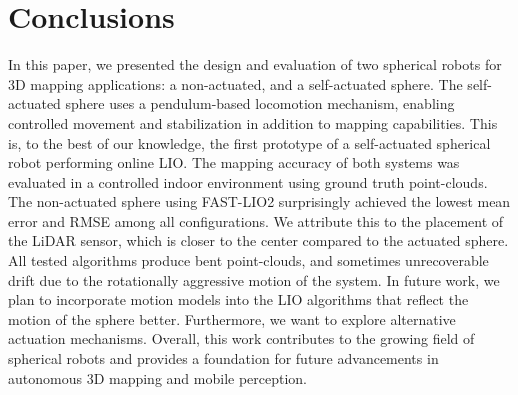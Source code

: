 \documentclass[a4paper, conference]{IEEEtran}
\begin{document}
\section*{Conclusions}
In this paper, we presented the design and evaluation of two spherical robots for 3D mapping applications: a non-actuated, and a self-actuated sphere. 
The self-actuated sphere uses a pendulum-based locomotion mechanism, enabling controlled movement and stabilization in addition to mapping capabilities.
This is, to the best of our knowledge, the first prototype of a self-actuated spherical robot performing online LIO.   
The mapping accuracy of both systems was evaluated in a controlled indoor environment using ground truth point-clouds. 
The non-actuated sphere using FAST-LIO2 surprisingly achieved the lowest mean error and RMSE among all configurations.
We attribute this to the placement of the LiDAR sensor, which is closer to the center compared to the actuated sphere.
All tested algorithms produce bent point-clouds, and sometimes unrecoverable drift due to the rotationally aggressive motion of the system.  
In future work, we plan to incorporate motion models into the LIO algorithms that reflect the motion of the sphere better.
Furthermore, we want to explore alternative actuation mechanisms.
Overall, this work contributes to the growing field of spherical robots and provides a foundation for future advancements in autonomous 3D mapping and mobile perception.



\vspace{12pt}
\end{document}
